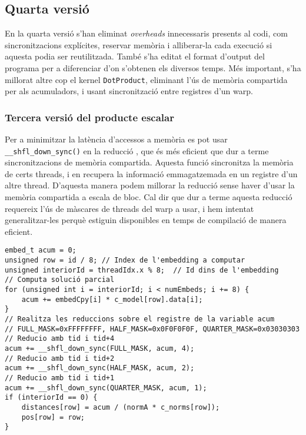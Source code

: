 \documentclass[catalan,10pt,a4paper]{article}
\begin{document}
\subsection*{Quarta versió}
En la quarta versió s'han eliminat \textit{overheads} innecessaris presents al codi, com sincronitzacions explícites, reservar memòria i alliberar-la cada execució si aquesta podia ser reutilitzada. També s'ha editat el format d'output del programa per a diferenciar d'on s'obtenen els diversos temps.
Més important, s'ha millorat altre cop el kernel \verb|DotProduct|, eliminant l'ús de memòria compartida per als acumuladors, i usant sincronització entre registres d'un warp.
\subsubsection*{Tercera versió del producte escalar}
Per a minimitzar la latència d'accessos a memòria es pot usar \verb|__shfl_down_sync()| en la reducció \cite{UsingCUD95:online}, que és més eficient que dur a terme sincronitzacions de memòria compartida. Aquesta funció sincronitza la memòria de certs threads, i en recupera la informació emmagatzemada en un registre d'un altre thread. D'aquesta manera podem millorar la reducció sense haver d'usar la memòria compartida a escala de bloc.\newline
Cal dir que dur a terme aquesta reducció requereix l'ús de màscares de threads del warp a usar, i hem intentat generalitzar-les perquè estiguin disponibles en temps de compilació de manera eficient.
\begin{verbatim}
embed_t acum = 0;
unsigned row = id / 8; // Index de l'embedding a computar
unsigned interiorId = threadIdx.x % 8;  // Id dins de l'embedding
// Computa solució parcial
for (unsigned int i = interiorId; i < numEmbeds; i += 8) {
	acum += embedCpy[i] * c_model[row].data[i]; 
}
// Realitza les reduccions sobre el registre de la variable acum
// FULL_MASK=0xFFFFFFFF, HALF_MASK=0x0F0F0F0F, QUARTER_MASK=0x03030303
// Reducio amb tid i tid+4
acum += __shfl_down_sync(FULL_MASK, acum, 4); 
// Reducio amb tid i tid+2
acum += __shfl_down_sync(HALF_MASK, acum, 2);
// Reducio amb tid i tid+1
acum += __shfl_down_sync(QUARTER_MASK, acum, 1);
if (interiorId == 0) {
	distances[row] = acum / (normA * c_norms[row]);
	pos[row] = row;
}
\end{verbatim}
\end{document}
